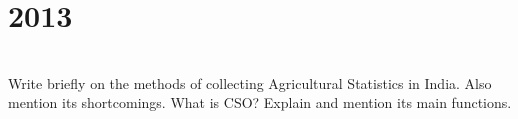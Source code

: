 \section*{2013}
\vspace{-.5cm}
\hrulefill \smallskip\\
 Write briefly on the methods of collecting Agricultural Statistics in India. Also mention its shortcomings.
\myline
{} What is CSO? Explain and mention its main functions.
